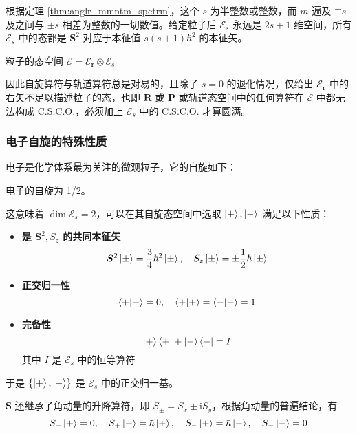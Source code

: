 \documentclass[cn,10pt,math=newtx,citestyle=gb7714-2015,bibstyle=gb7714-2015]{elegantbook}
\def\bm{\boldsymbol}
\def\ms{\mathscr}
\def\i{\mathrm i}
\def\ox{\otimes}
\begin{document}
根据定理 \ref{thm:anglr_mmntm_spctrm}，这个 $s$ 为半整数或整数，而 $m$ 遍及 $\mp s$ 及之间与 $\pm s$ 相差为整数的一切数值。给定粒子后 $\ms E_s$ 永远是 $2s+1$ 维空间，所有 $\ms E_s$ 中的态都是 $\bm S^2$ 对应于本征值 $s(s+1)\hbar^2$ 的本征矢。

\begin{postulate}[态空间的完整结构]
粒子的态空间 $\ms E = \ms E_{\bm r}\ox\ms E_s$
\end{postulate}

因此自旋算符与轨道算符总是对易的，且除了 $s=0$ 的退化情况，仅给出 $\ms E_{\bm r}$ 中的右矢不足以描述粒子的态，也即 $\bm R$ 或 $\bm P$ 或轨道态空间中的任何算符在 $\ms E$ 中都无法构成 C.S.C.O.，必须加上 $\ms E_s$ 中的 C.S.C.O. 才算圆满。

\subsubsection{电子自旋的特殊性质}

电子是化学体系最为关注的微观粒子，它的自旋如下：
\begin{postulate}[电子的自旋]
电子的自旋为 1/2。
\end{postulate}
这意味着 $\dim\ms E_s=2$，可以在其自旋态空间中选取 $\ket{+},\ket{-}$ 满足以下性质：
\begin{itemize}
    \item \textbf{是 $\bm S^2,S_z$ 的共同本征矢}
    \begin{equation}
        \bm S^2\ket{\pm} = \frac 3 4\hbar^2\ket{\pm},\quad S_z\ket{\pm} = \pm\frac 1 2\hbar\ket{\pm}
    \end{equation}
    \item \textbf{正交归一性}
    \begin{equation}
        \braket{+|-} = 0,\quad \braket{+|+}=\braket{-|-} = 1
    \end{equation}
    \item \textbf{完备性}
    \begin{equation}
        \ket{+}\bra{+}+\ket{-}\bra{-} = I
    \end{equation}
    其中 $I$ 是 $\ms E_s$ 中的恒等算符
\end{itemize}
于是 $\{\ket{+},\ket{-}\}$ 是 $\ms E_s$ 中的正交归一基。

$\bm S$ 还继承了角动量的升降算符，即 $S_\pm = S_x\pm\i S_y$，根据角动量的普遍结论，有
\begin{equation}
    S_+\ket{+} = 0,\quad S_+\ket{-} = \hbar\ket{+},\quad S_-\ket{+} = \hbar\ket{-},\quad S_-\ket{-} = 0
\end{equation}
\end{document}
